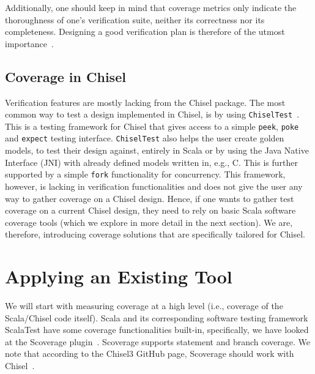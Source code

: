 \documentclass[conference]{IEEEtran}
\newcommand{\martin}[1]{{\color{blue} Martin: #1}}
\begin{document}
Additionally, one should keep in mind that coverage metrics only indicate the thoroughness of one's verification suite, neither its correctness nor its completeness. Designing a good verification plan is therefore of the utmost importance~\cite{hdlverify}.

\subsection{Coverage in Chisel} 
Verification features are mostly lacking from the Chisel package. 
The most common way to test a design implemented in Chisel, is by using \texttt{ChiselTest}~\cite{chisel:tester2}. 
This is a testing framework for Chisel that gives access to a simple \texttt{peek}, \texttt{poke} and \texttt{expect} testing interface. 
\texttt{ChiselTest} also helps the user create golden models, to test their design against, entirely in Scala or by using the Java Native Interface (JNI) with already defined models written in, e.g., C. This is further supported by a simple \texttt{fork} functionality for concurrency.  
This framework, however, is lacking in verification functionalities and does not give the user any way to gather coverage on a Chisel design.
Hence, if one wants to gather test coverage on a current Chisel design, they need to rely on basic Scala software coverage tools (which we explore in more detail in the next section). 
We are, therefore, introducing coverage solutions that are specifically tailored for Chisel.

\section{Applying an Existing Tool}
We will start with measuring coverage at a high level (i.e., coverage of the Scala/Chisel code itself). Scala and its corresponding software testing framework ScalaTest have some coverage functionalities built-in, specifically, we have looked at the Scoverage plugin~\cite{scoverage}. Scoverage supports statement and branch coverage. We note that according to the Chisel3 GitHub page, Scoverage should work with Chisel~\cite{chisel:scoverage}.

\end{document}
